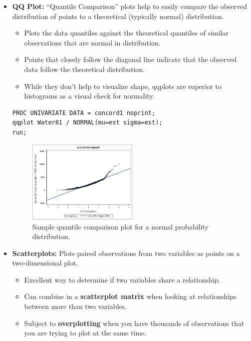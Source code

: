 \documentclass[12pt]{notes}
\begin{document}
\begin{itemize}
\item \textbf{QQ Plot:} ``Quantile Comparison'' plots help to easily compare the observed distribution of points to a theoretical (typically normal) distribution. 
\begin{itemize}
\item Plots the data quantiles against the theoretical quantiles of similar observations that are normal in distribution.
\item Points that closely follow the diagonal line indicate that the observed data follow the theoretical distribution.
\item While they don't help to visualize shape, qqplots are superior to histograms as a visual check for normality.
\end{itemize}

\begin{verbatim}
PROC UNIVARIATE DATA = concord1 noprint;
qqplot Water81 / NORMAL(mu=est sigma=est);
run;
\end{verbatim}

\begin{figure}[H]
\centering
\includegraphics[width = 0.5\textwidth]{figures/module1/sampQQ.png}
\caption{Sample quantile comparison plot for a normal probability distribution.}
\end{figure}

\item \textbf{Scatterplots:} Plots paired observations from two variables as points on a two-dimensional plot. 
\begin{itemize}
\item Excellent way to determine if two variables share a relationship. 
\item Can combine in a \textbf{scatterplot matrix} when looking at relationships between more than two variables. 
\item Subject to \textbf{overplotting} when you have thousands of observations that you are trying to plot at the same time. 
\end{itemize}


\end{itemize}
\end{document}
